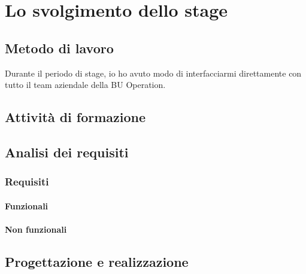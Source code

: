 
\chapter{Lo svolgimento dello stage}
\label{cap:svolgimento-stage}
\vspace{20pt}
\section{Metodo di lavoro}
Durante il periodo di stage, io ho avuto modo di interfacciarmi 
direttamente con tutto il team aziendale della BU Operation.   



\section{Attività di formazione}

\section{Analisi dei requisiti}

\subsection{Requisiti}

\subsubsection{Funzionali}

\subsubsection{Non funzionali}


\section{Progettazione e realizzazione}

